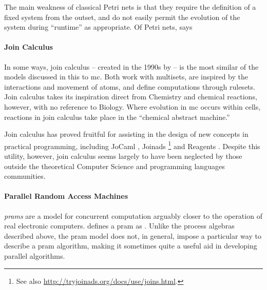 The main weakness of classical Petri nets is that they require the definition of a fixed system from the outset, and do not easily permit the evolution of the system during ``runtime'' as appropriate.  Of Petri nets, \citeauthor{Varela2013} says 

\paragraph{Join Calculus}
In some ways, join calculus -- created in the 1990s by \citeauthor{Fournet1996} \cite{Fournet1996,Fournet2002} -- is the most similar of the models discussed in this  to \gls{mc}.  Both work with multisets, are inspired by the interactions and movement of atoms, and define computations through rulesets.  Join calculus takes its inspiration direct from Chemistry and chemical reactions, however, with no reference to Biology.  Where evolution in \gls{mc} occurs within cells, reactions in join calculus take place in the ``chemical abstract machine.''

Join calculus has proved fruitful for assisting in the design of new concepts in practical programming, including JoCaml \cite{Fournet2003}, Joinads \cite{Petricek2011}\footnote{See also \url{http://tryjoinads.org/docs/use/joins.html}.} and Reagents \cite{Turon2012}.  Despite this utility, however, join calculus seems largely to have been neglected by those outside the theoretical Computer Science and programming languages communities.

\paragraph{\label{sec:back:pram}Parallel Random Access Machines}

\emph{\Glspl{pram}} are a model for concurrent computation arguably closer to the operation of real electronic computers.  \citeauthor{JaJa2011} defines a \gls{pram} as .  Unlike the process algebras described above, the \gls{pram} model does not, in general, impose a particular way to describe a \gls{pram} algorithm, making it sometimes quite a useful aid in developing parallel algorithms.

